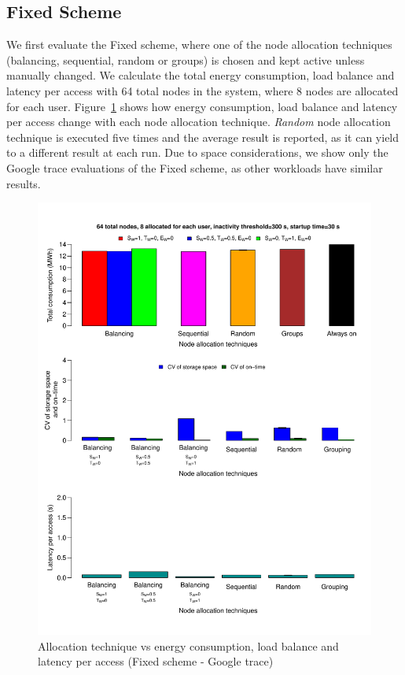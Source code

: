 \documentclass[preprint,12pt]{elsarticle}
\begin{document}
\subsection{Fixed Scheme}
We first evaluate the Fixed scheme, where one of the node allocation techniques (balancing, sequential,
random or groups) is chosen and kept active unless manually changed. We calculate the total
energy consumption, load balance and latency per access with 64 total nodes in the system,
where 8 nodes are allocated for each user. Figure~\ref{firstresult} shows how energy consumption, load balance
and latency per access change with each node allocation technique. \textit{Random} node allocation technique is
executed five times and the average result is reported, as it can yield to a different result
at each run. Due to space considerations, we show only the Google trace evaluations of the Fixed scheme,
as other workloads have similar results. 
 
\begin{figure}[!htbp]
\centering
\includegraphics[width=\columnwidth,keepaspectratio]{FIG6.pdf}
\caption{Allocation technique vs energy consumption, load balance and latency per access (Fixed scheme - Google trace)}
\label{firstresult}
\end{figure}
\end{document}
